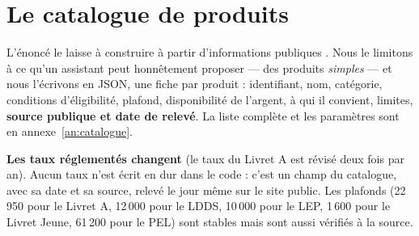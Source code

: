 \section{Le catalogue de produits}

L'énoncé le laisse à construire \og à partir d'informations publiques \fg. Nous le limitons à ce
qu'un assistant peut honnêtement proposer --- des produits \emph{simples} --- et nous l'écrivons en
JSON, une fiche par produit : identifiant, nom, catégorie, conditions d'éligibilité, plafond,
disponibilité de l'argent, à qui il convient, limites, \textbf{source publique et date de
relevé}. La liste complète et les paramètres sont en annexe~\ref{an:catalogue}.

\begin{attention}
\textbf{Les taux réglementés changent} (le taux du Livret A est révisé deux fois par an). Aucun taux
n'est écrit en dur dans le code : c'est un champ du catalogue, avec sa date et sa source, relevé le
jour même sur le site public. Les plafonds (22\,950\eur{} pour le Livret A, 12\,000\eur{} pour le
LDDS, 10\,000\eur{} pour le LEP, 1\,600\eur{} pour le Livret Jeune, 61\,200\eur{} pour le PEL) sont
stables mais sont aussi vérifiés à la source.
\end{attention}

